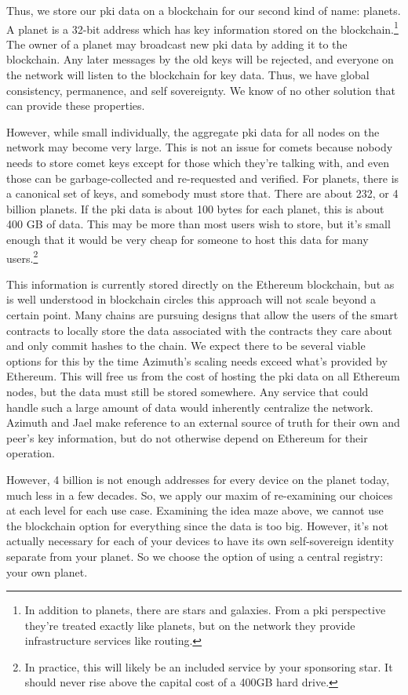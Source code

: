 \documentclass[twoside]{article}
\begin{document}
Thus, we store our {\sc pki} data on a blockchain for our second kind of name:
planets. A planet is a 32-bit address which has key information stored
on the blockchain.\footnote{In addition to planets, there are stars and galaxies. From a {\sc pki}
perspective they're treated exactly like planets, but on the network
they provide infra\-structure services like
routing.} The
owner of a planet may broadcast new {\sc pki} data by adding it to the
blockchain. Any later messages by the old keys will be rejected, and
everyone on the network will listen to the blockchain for key data.
Thus, we have global consistency, permanence, and self sovereignty. We
know of no other solution that can provide these properties.

However, while small individually, the aggregate {\sc pki} data for all nodes
on the network may become very large. This is not an issue for comets
because nobody needs to store comet keys except for those which they're
talking with, and even those can be garbage-collected and re-requested
and verified. For planets, there is a canonical set of keys, and
somebody must store that. There are about 232, or 4 billion planets. If
the {\sc pki} data is about 100 bytes for each planet, this is about 400 GB of
data. This may be more than most users wish to store, but it's small
enough that it would be very cheap for someone to host this data for
many users.\footnote{In practice, this will likely be an included service by your
sponsoring star. It should never rise above the capital cost of a
400GB hard drive.}

\sloppy
This information is currently stored directly on the Ether\-eum blockchain, but as is well understood in blockchain circles this
approach will not scale beyond a certain point. Many chains are pursuing
designs that allow the users of the smart contracts to locally store the
data associated with the contracts they care about and only commit
hashes to the chain. We expect there to be several viable options for
this by the time Azi\-muth's scaling needs exceed what's provided by Ethereum. This will free us from the cost of hosting the {\sc pki} data on all
Ethereum nodes, but the data must still be stored somewhere. Any service
that could handle such a large amount of data would inherently
centralize the network. Azimuth and Jael make reference to an external source of truth for their own and peer's key information, but do not otherwise depend on Ethereum for their operation.

However, 4 billion is not enough addresses for every device on the
planet today, much less in a few decades. So, we apply our maxim of
re-examining our choices at each level for each use case. Examining the
idea maze above, we cannot use the blockchain option for everything
since the data is too big. However, it's not actually necessary for each
of your devices to have its own self-sovereign identity separate from
your planet. So we choose the option of using a central registry: your
own planet.
\end{document}
